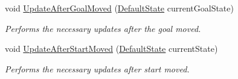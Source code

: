 \begin{DoxyCompactItemize}
\item 
void \hyperlink{class_a_r_astar_planner_aa5e93fed6680adb3a8e1c0d84b7a6bc1}{Update\-After\-Goal\-Moved} (\hyperlink{class_default_state}{Default\-State} current\-Goal\-State)
\begin{DoxyCompactList}\small\item\em Performs the necessary updates after the goal moved. \end{DoxyCompactList}\item 
void \hyperlink{class_a_r_astar_planner_a5cead1843fe3fce8f0a222fdb5ae0192}{Update\-After\-Start\-Moved} (\hyperlink{class_default_state}{Default\-State} current\-State)
\begin{DoxyCompactList}\small\item\em Performs the necessary updates after start moved. \end{DoxyCompactList}\end{DoxyCompactItemize}

